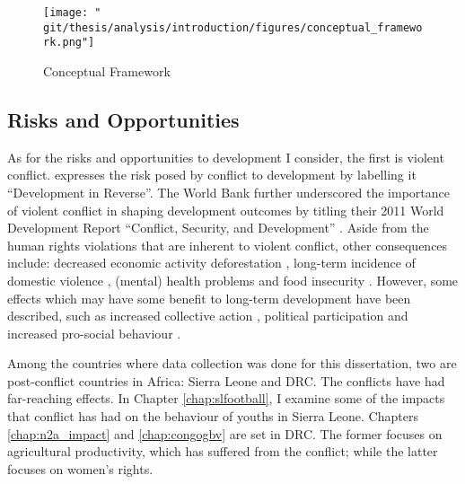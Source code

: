\begin{figure}[htb]
  \centering
  \texttt{[image: "\\git/thesis/analysis/introduction/figures/conceptual\_framework.png"]}
  \caption{Conceptual Framework}
  \label{intro:fig:framework}
\end{figure}

\subsection{Risks and Opportunities}
As for the risks and opportunities to development I consider, the first is violent conflict.  \citet{Collier2003}  expresses the risk posed by conflict to development by labelling it ``Development in Reverse''. The World Bank further underscored the importance of violent conflict in shaping development outcomes by titling their 2011 World Development Report ``Conflict, Security, and Development'' \citep{WorldBank2011}. Aside from the human rights violations that are inherent to violent conflict, other consequences include: decreased economic activity \citep{Collier1999} deforestation \cite[e.g.][]{Connectiona}, long-term incidence of domestic violence \citep[e.g.][]{LaMattina2017, Muller2019}, (mental) health problems \cite[e.g.][]{Smith2002, Iqbal2006a,Akresh2011} and food insecurity \cite[e.g.][]{Lecoutere2005, Verwimp2012}. However, some effects which may have some benefit to long-term development have been described, such as increased collective action \citep{Bellows2009b}, political participation \citep{Blattman2009a} and increased pro-social behaviour \citep{Voors2012a}.

Among the countries where data collection was done for this dissertation, two are post-conflict countries in Africa:  Sierra Leone and DRC. The conflicts have had far-reaching effects. In Chapter \ref{chap:slfootball}, I examine some of the impacts that conflict has had on the behaviour of youths in Sierra Leone. Chapters \ref{chap:n2a_impact} and \ref{chap:congogbv} are set in DRC. The former focuses on agricultural productivity, which has suffered from the conflict; while the latter focuses on women's rights. %

